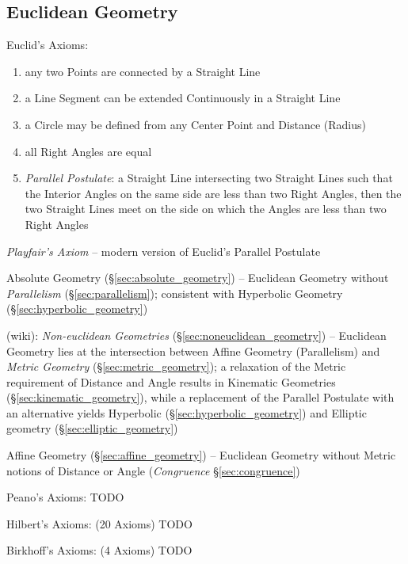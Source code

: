 \subsection{Euclidean Geometry}\label{sec:euclidean_geometry}

Euclid's Axioms:
\begin{enumerate}
  \item any two Points are connected by a Straight Line
  \item a Line Segment can be extended Continuously in a Straight Line
  \item a Circle may be defined from any Center Point and Distance (Radius)
  \item all Right Angles are equal
  \item \emph{Parallel Postulate}: a Straight Line intersecting two Straight
    Lines such that the Interior Angles on the same side are less than two Right
    Angles, then the two Straight Lines meet on the side on which the Angles are
    less than two Right Angles
\end{enumerate}

\emph{Playfair's Axiom} -- modern version of Euclid's Parallel Postulate

Absolute Geometry (\S\ref{sec:absolute_geometry}) -- Euclidean Geometry
without \emph{Parallelism} (\S\ref{sec:parallelism}); consistent with Hyperbolic
Geometry (\S\ref{sec:hyperbolic_geometry})

(wiki): \emph{Non-euclidean Geometries} (\S\ref{sec:noneuclidean_geometry}) --
Euclidean Geometry lies at the intersection between Affine Geometry
(Parallelism) and \emph{Metric Geometry} (\S\ref{sec:metric_geometry}); a
relaxation of the Metric requirement of Distance and Angle results in Kinematic
Geometries (\S\ref{sec:kinematic_geometry}), while a replacement of the Parallel
Postulate with an alternative yields Hyperbolic
(\S\ref{sec:hyperbolic_geometry}) and Elliptic geometry
(\S\ref{sec:elliptic_geometry})

Affine Geometry (\S\ref{sec:affine_geometry}) -- Euclidean Geometry without
Metric notions of Distance or Angle (\emph{Congruence} \S\ref{sec:congruence})

Peano's Axioms: TODO

Hilbert's Axioms: (20 Axioms) TODO

Birkhoff's Axioms: (4 Axioms) TODO

